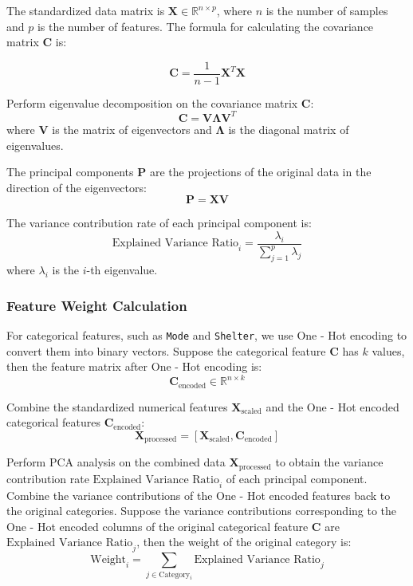 \documentclass{mcmthesis}
\begin{document}
The standardized data matrix is $\mathbf{X} \in \mathbb{R}^{n \times p}$, where $n$ is the number of samples and $p$ is the number of features. The formula for calculating the covariance matrix $\mathbf{C}$ is:

\begin{equation}
\mathbf{C} = \frac{1}{n - 1} \mathbf{X}^T \mathbf{X}
\end{equation}

Perform eigenvalue decomposition on the covariance matrix $\mathbf{C}$:
\begin{equation}
\mathbf{C} = \mathbf{V} \mathbf{\Lambda} \mathbf{V}^T
\end{equation}
where $\mathbf{V}$ is the matrix of eigenvectors and $\mathbf{\Lambda}$ is the diagonal matrix of eigenvalues.

The principal components $\mathbf{P}$ are the projections of the original data in the direction of the eigenvectors:
\begin{equation}
\mathbf{P} = \mathbf{X} \mathbf{V}
\end{equation}

The variance contribution rate of each principal component is:
\begin{equation}
\text{Explained Variance Ratio}_i = \frac{\lambda_i}{\sum_{j = 1}^p \lambda_j}
\end{equation}
where $\lambda_i$ is the $i$-th eigenvalue.

\subsubsection{Feature Weight Calculation}

For categorical features, such as \texttt{Mode} and \texttt{Shelter}, we use One - Hot encoding to convert them into binary vectors. Suppose the categorical feature $\mathbf{C}$ has $k$ values, then the feature matrix after One - Hot encoding is:
\begin{equation}
\mathbf{C}_{\text{encoded}} \in \mathbb{R}^{n \times k}
\end{equation}

Combine the standardized numerical features $\mathbf{X}_{\text{scaled}}$ and the One - Hot encoded categorical features $\mathbf{C}_{\text{encoded}}$:
\begin{equation}
\mathbf{X}_{\text{processed}} = [\mathbf{X}_{\text{scaled}}, \mathbf{C}_{\text{encoded}}]
\end{equation}

Perform PCA analysis on the combined data $\mathbf{X}_{\text{processed}}$ to obtain the variance contribution rate $\text{Explained Variance Ratio}_i$ of each principal component. Combine the variance contributions of the One - Hot encoded features back to the original categories. Suppose the variance contributions corresponding to the One - Hot encoded columns of the original categorical feature $\mathbf{C}$ are $\text{Explained Variance Ratio}_j$, then the weight of the original category is:
\begin{equation}
\text{Weight}_i = \sum_{j \in \text{Category}_i} \text{Explained Variance Ratio}_j
\end{equation}
\end{document}

